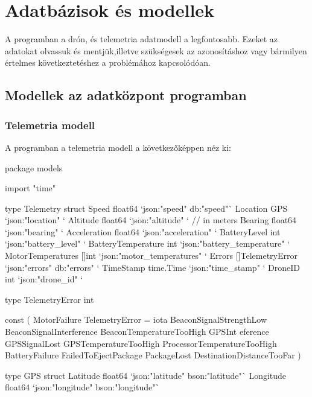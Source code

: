 

\section{Adatbázisok és modellek}
A programban a drón, és telemetria adatmodell a legfontosabb.
Ezeket az adatokat olvassuk és mentjük,illetve szükségesek az azonosításhoz vagy bármilyen értelmes következtetéshez a problémához kapcsolódóan.

\subsection{Modellek az adatközpont programban}
\subsubsection{Telemetria modell}
A programban a telemetria modell a következőképpen néz ki:
\begin{python}
    package models

    import "time"

    type Telemetry struct {
        Speed              float64          `json:"speed" db:"speed"`
        Location           GPS              `json:"location" `
        Altitude           float64          `json:"altitude" ` // in meters
        Bearing            float64          `json:"bearing" `
        Acceleration       float64          `json:"acceleration" `
        BatteryLevel       int              `json:"battery_level" `
        BatteryTemperature int              `json:"battery_temperature" `
        MotorTemperatures  []int            `json:"motor_temperatures" `
        Errors             []TelemetryError `json:"errors" db:"errors" `
        TimeStamp          time.Time        `json:"time_stamp" `
        DroneID            int              `json:"drone_id" `
    }

    type TelemetryError int

    const (
        MotorFailure TelemetryError = iota
        BeaconSignalStrengthLow
        BeaconSignalInterference
        BeaconTemperatureTooHigh
        GPSInt	eference
        GPSSignalLost
        GPSTemperatureTooHigh
        ProcessorTemperatureTooHigh
        BatteryFailure
        FailedToEjectPackage
        PackageLost
        DestinationDistanceTooFar
    )

    type GPS struct {
        Latitude  float64 `json:"latitude" bson:"latitude"`
        Longitude float64 `json:"longitude" bson:"longitude"`
    }

\end{python}



